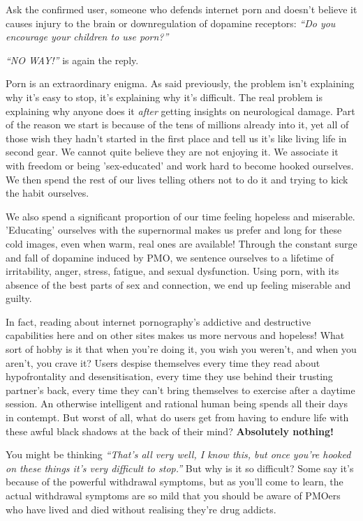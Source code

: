 \documentclass[
]{book}
\begin{document}
Ask the confirmed user, someone who defends internet porn and doesn't believe it causes injury to the brain or downregulation of dopamine receptors: \emph{``Do you encourage your children to use porn?''}

\emph{``NO WAY!''} is again the reply.

Porn is an extraordinary enigma. As said previously, the problem isn't explaining why it's easy to stop, it's explaining why it's difficult. The real problem is explaining why anyone does it \emph{after} getting insights on neurological damage. Part of the reason we start is because of the tens of millions already into it, yet all of those wish they hadn't started in the first place and tell us it's like living life in second gear. We cannot quite believe they are not enjoying it. We associate it with freedom or being 'sex-educated' and work hard to become hooked ourselves. We then spend the rest of our lives telling others not to do it and trying to kick the habit ourselves.

We also spend a significant proportion of our time feeling hopeless and miserable. 'Educating' ourselves with the supernormal makes us prefer and long for these cold images, even when warm, real ones are available! Through the constant surge and fall of dopamine induced by PMO, we sentence ourselves to a lifetime of irritability, anger, stress, fatigue, and sexual dysfunction. Using porn, with its absence of the best parts of sex and connection, we end up feeling miserable and guilty.

In fact, reading about internet pornography's addictive and destructive capabilities here and on other sites makes us more nervous and hopeless! What sort of hobby is it that when you're doing it, you wish you weren't, and when you aren't, you crave it? Users despise themselves every time they read about hypofrontality and desensitisation, every time they use behind their trusting partner's back, every time they can't bring themselves to exercise after a daytime session. An otherwise intelligent and rational human being spends all their days in contempt. But worst of all, what do users get from having to endure life with these awful black shadows at the back of their mind? \textbf{Absolutely nothing!}

You might be thinking \emph{``That's all very well, I know this, but once you're hooked on these things it's very difficult to stop.''} But why is it so difficult? Some say it's because of the powerful withdrawal symptoms, but as you'll come to learn, the actual withdrawal symptoms are so mild that you should be aware of PMOers who have lived and died without realising they're drug addicts.
\end{document}
